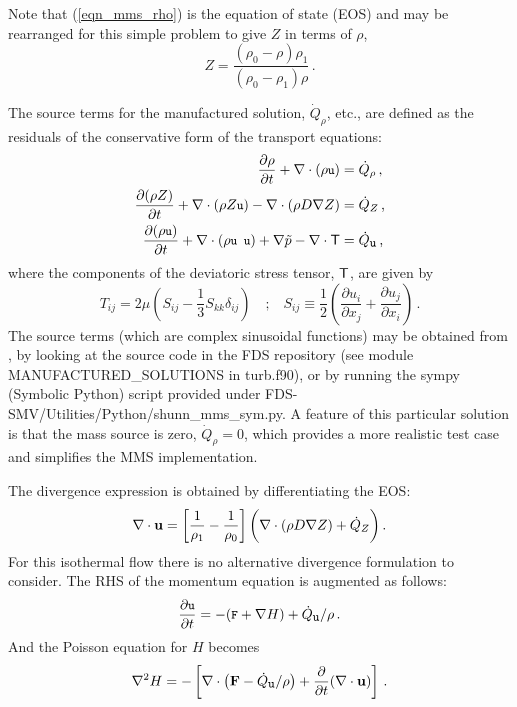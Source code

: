 \documentclass[11pt]{book}
\begin{document}
Note that (\ref{eqn_mms_rho}) is the equation of state (EOS) and may be rearranged for this simple problem to give $Z$ in terms of $\rho$,
\begin{equation}
\label{eqn_mms_eos}
Z = \frac{(\rho_0 - \rho) \rho_1}{(\rho_0 - \rho_1) \rho} \,\mbox{.}
\end{equation}

The source terms for the manufactured solution, $\dot{Q}_\rho$, etc., are defined as the residuals of the conservative form of the transport equations:
\begin{align}
\label{eqn_mms_continuity} \frac{\partial \rho}{\partial t} + \nabla\cdot(\rho \texttt{\small u}) &= \dot{Q}_\rho \,\mbox{,}\\
\frac{\partial (\rho Z)}{\partial t} + \nabla\cdot(\rho Z \texttt{\small u}) - \nabla\cdot\left(\rho D \nabla Z\right) &= \dot{Q}_Z \,\mbox{,}\\
\frac{\partial (\rho \texttt{\small u})}{\partial t} + \nabla\cdot(\rho \texttt{\small u u}) + \nabla \tilde{p} - \nabla\cdot{\sf T} &= \dot{Q}_{\texttt{\small u}} \,\mbox{,}
\end{align}
where the components of the deviatoric stress tensor, ${\sf T}$, are given by
\begin{equation}
T_{ij} = 2\mu \left( S_{ij} -  \frac{1}{3} S_{kk} \delta_{ij} \right) \quad\mbox{;}\quad S_{ij} \equiv \frac{1}{2}\left( \frac{\partial u_i}{\partial x_j} + \frac{\partial u_j}{\partial x_i} \right) \,\mbox{.}
\end{equation}
The source terms (which are complex sinusoidal functions) may be obtained from \cite{Shunn:2012}, by looking at the source code in the FDS repository \cite{FDS-SMV_repository} (see module {\ct MANUFACTURED\_SOLUTIONS} in {\ct turb.f90}), or by running the sympy (Symbolic Python) script provided under {\ct FDS-SMV/Utilities/Python/shunn\_mms\_sym.py}.  A feature of this particular solution is that the mass source is zero, $\dot{Q}_\rho = 0$, which provides a more realistic test case and simplifies the MMS implementation.

The divergence expression is obtained by differentiating the EOS:
\begin{equation}
\label{eqn_mms_div}
\nabla\cdot\mathbf{u} = \left[ \frac{1}{\rho_1} - \frac{1}{\rho_0} \right] \bigg( \nabla\cdot(\rho D \nabla Z) + \dot{Q}_Z \bigg) \,\mbox{.}
\end{equation}
For this isothermal flow there is no alternative divergence formulation to consider. The RHS of the momentum equation is augmented as follows:
\begin{equation}
\label{eqn_mms_u_eqn}
\frac{\partial \texttt{\small u}}{\partial t} = - ( \texttt{\small F} + \nabla H ) + \dot{Q}_{\texttt{\small u}}/\rho \,\mbox{.}
\end{equation}
And the Poisson equation for $H$ becomes
\begin{align}
\label{eqn_poisson_mms}
\nabla^2 H = - \left[ \nabla\cdot \left( \mathbf{F} - \dot{Q}_{\texttt{\small u}}/\rho \right) + \frac{\partial}{\partial t} (\nabla\cdot\mathbf{u}) \right] \,\mbox{.}
\end{align}
\end{document}
